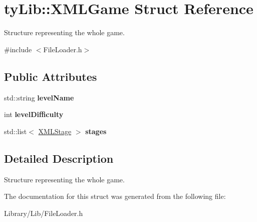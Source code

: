 \hypertarget{structty_lib_1_1_x_m_l_game}{}\section{ty\+Lib\+:\+:X\+M\+L\+Game Struct Reference}
\label{structty_lib_1_1_x_m_l_game}


Structure representing the whole game.  




{\ttfamily \#include $<$File\+Loader.\+h$>$}

\subsection*{Public Attributes}
\begin{DoxyCompactItemize}
\item 
\hypertarget{structty_lib_1_1_x_m_l_game_a5fc1c4f1ab7c54358c8b89f8cf50cdeb}{}std\+::string {\bfseries level\+Name}\label{structty_lib_1_1_x_m_l_game_a5fc1c4f1ab7c54358c8b89f8cf50cdeb}

\item 
\hypertarget{structty_lib_1_1_x_m_l_game_a167c21f1aefad64ce049c7a6caf8a6fe}{}int {\bfseries level\+Difficulty}\label{structty_lib_1_1_x_m_l_game_a167c21f1aefad64ce049c7a6caf8a6fe}

\item 
\hypertarget{structty_lib_1_1_x_m_l_game_a5e787a89561926b57c8bb8bdf29ca765}{}std\+::list$<$ \hyperlink{structty_lib_1_1_x_m_l_stage}{X\+M\+L\+Stage} $>$ {\bfseries stages}\label{structty_lib_1_1_x_m_l_game_a5e787a89561926b57c8bb8bdf29ca765}

\end{DoxyCompactItemize}


\subsection{Detailed Description}
Structure representing the whole game. 

The documentation for this struct was generated from the following file\+:\begin{DoxyCompactItemize}
\item 
Library/\+Lib/File\+Loader.\+h\end{DoxyCompactItemize}
